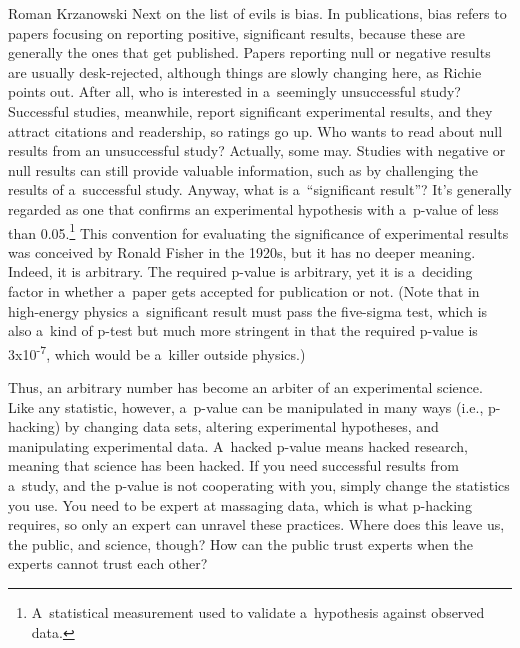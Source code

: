 \begin{newrevengenv}{Roman Krzanowski}
Next on the list of evils is bias. In publications, bias refers to papers focusing on reporting positive, significant results, because these are generally the ones that get published. Papers reporting null or negative results are usually desk-rejected, although things are slowly changing here, as Richie points out. After all, who is interested in a~seemingly unsuccessful study? Successful studies, meanwhile, report significant experimental results, and they attract citations and readership, so ratings go up. Who wants to read about null results from an unsuccessful study? Actually, some may. Studies with negative or null results can still provide valuable information, such as by challenging the results of a~successful study. Anyway, what is a~``significant result''? It's generally regarded as one that confirms an experimental hypothesis with a~p-value of less than 0.05.\footnote{A~statistical measurement used to validate a~hypothesis against observed data.} This convention for evaluating the significance of experimental results was conceived by Ronald Fisher in the 1920s, but it has no deeper meaning. Indeed, it is arbitrary. The required p-value is arbitrary, yet it is a~deciding factor in whether a~paper gets accepted for publication or not. (Note that in high-energy physics a~significant result must pass the five-sigma test, which is also a~kind of p-test but much more stringent in that the required p-value is 3x10\textsuperscript{{}-7}, which would be a~killer outside physics.)

Thus, an arbitrary number has become an arbiter of an experimental science. Like any statistic, however, a~p-value can be manipulated in many ways (i.e., p-hacking) by changing data sets, altering experimental hypotheses, and manipulating experimental data. A~hacked p-value means hacked research, meaning that science has been hacked. If you need successful results from a~study, and the p-value is not cooperating with you, simply change the statistics you use. You need to be expert at massaging data, which is what p-hacking requires, so only an expert can unravel these practices. Where does this leave us, the public, and science, though? How can the public trust experts when the experts cannot trust each other?


\end{newrevengenv}
